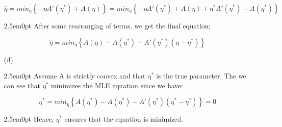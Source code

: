 \documentclass[11pt]{article}
\newenvironment{problem}[2][Problem]{\begin{trivlist}
\item[\hskip \labelsep {\bfseries #1}\hskip \labelsep {\bfseries #2.}]}{\end{trivlist}}
\begin{document}
\begin{problem}{2.3}
\[\hat{\eta} = min_{\eta}\left\{{-\eta A'(\eta^{*})+A(\eta)}\right\} = min_{\eta}\left\{{-\eta A'(\eta^{*})+A(\eta) + \eta^{*}A'(\eta^{*}) - A(\eta^{*})}\right\}\]

\begin{adjustwidth}{2.5em}{0pt}
After some rearranging of terms, we get the final equation:
\end{adjustwidth}

\[\hat{\eta}= min_{\eta}\left\{ A(\eta) - A(\eta^{*}) - A'(\eta^{*})(\eta - \eta^{*})\right\} \]

(d) 
\begin{adjustwidth}{2.5em}{0pt}
Assume A is strictly convex and that $\eta^{*}$ is the true parameter. The we can see that $\eta^{*}$ minimizes the MLE equation since we have:
\end{adjustwidth}

\[\eta^{*}= min_{\eta}\left\{ A(\eta^{*}) - A(\eta^{*}) - A'(\eta^{*})(\eta^{*} - \eta^{*})\right\} = 0\]

\begin{adjustwidth}{2.5em}{0pt}
Hence, $\eta^{*}$ ensures that the equation is minimized. 
\end{adjustwidth}

\end{problem}
\end{document}
